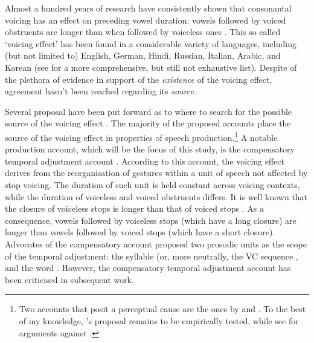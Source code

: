 \documentclass[preprint]{JASAnew}
\begin{document}
Almost a hundred years of research have consistently shown that
consonantal voicing has an effect on preceding vowel duration: vowels
followed by voiced obstruents are longer than when followed by voiceless
ones
\citep{heffner1937, house1953, belasco1953, peterson1960, halle1967, chen1970, klatt1973, lisker1974, raphael1975, javkin1976, maddieson1976, farnetani1986, kluender1988, laeufer1992, fowler1992, hussein1994, esposito2002, lampp2004, warren2005, durvasula2012}.
This so called `voicing effect' has been found in a considerable variety
of languages, including (but not limited to) English, German, Hindi,
Russian, Italian, Arabic, and Korean (see \citealt{maddieson1976} for a
more comprehensive, but still not exhaustive list). Despite of the
plethora of evidence in support of the \emph{existence} of the voicing
effect, agreement hasn't been reached regarding its \emph{source}.

Several proposal have been put forward as to where to search for the
possible source of the voicing effect \citep[see][ and \citet{begus2017}
for an overview]{soskuthy2013}. The majority of the proposed accounts
place the source of the voicing effect in properties of speech
production.\footnote{Two accounts that posit a perceptual cause are the ones by \citet{javkin1976} and \citet{kluender1988}. To the best of my knowledge, \citet{javkin1976}'s proposal remains to be empirically tested, while see \citet{fowler1992} for arguments against \citet{kluender1988}.}
A notable production account, which will be the focus of this study, is
the compensatory temporal adjustment account
\citep{lindblom1967, slis1969a, slis1969, lehiste1970, lehiste1970a}.
According to this account, the voicing effect derives from the
reorganisation of gestures within a unit of speech not affected by stop
voicing. The duration of such unit is held constant across voicing
contexts, while the duration of voiceless and voiced obstruents differs.
It is well known that the closure of voiceless stops is longer than that
of voiced stops
\citep{lisker1957, van-summers1987, davis1989, de-jong1991}. As a
consequence, vowels followed by voiceless stops (which have a long
closure) are longer than vowels followed by voiced stops (which have a
short closure). Advocates of the compensatory account proposed two
prosodic units as the scope of the temporal adjustment: the syllable
(or, more neutrally, the VC sequence \citep{lindblom1967}, and the word
\citep{slis1969a, slis1969, lehiste1970, lehiste1970a}. However, the
compensatory temporal adjustment account has been criticised in
subsequent work.
\end{document}
